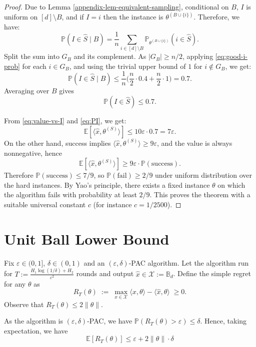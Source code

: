 \begin{proof}
Due to Lemma \ref{appendix-lem-equivalent-sampling}, conditional on $B$, $I$ is uniform on $[d]\setminus B$, and if $I=i$ then the instance is
$\theta^{(B\cup\{i\})}$. Therefore, we have:
\begin{equation}\label{eq:avg}
\mathbb P(I\in \hat S\mid B)
=\frac{1}{n}\sum_{i\in[d]\setminus B}\mathbb P_{\theta^{(B\cup\{i\})}}(i\in \hat S).
\end{equation}
Split the sum into $G_B$ and its complement. As $|G_B|\ge n/2$,
applying \eqref{eq:good-i-prob} for each $i\in G_B$, and using the trivial upper bound of $1$ for $i\notin G_B$, we get:
\[
\mathbb P(I\in \hat S\mid B)
\le \frac{1}{n}\Big(\frac{n}{2}\cdot 0.4 + \frac{n}{2}\cdot 1\Big)=0.7.
\]
Averaging over $B$ gives
\begin{equation}\label{eq:PI}
\mathbb P(I\in \hat S)\le 0.7.
\end{equation}

From \eqref{eq:value-vs-I} and \eqref{eq:PI}, we get:
\[
\mathbb E[\langle \hat x,\theta^{(S)}\rangle]\le 10\varepsilon\cdot 0.7=7\varepsilon.
\]
On the other hand, success implies $\langle \hat x,\theta^{(S)}\rangle\ge 9\varepsilon$, and the value is always
nonnegative, hence
\[
\mathbb E[\langle \hat x,\theta^{(S)}\rangle]\ge 9\varepsilon\cdot \mathbb P(\text{success}).
\]
Therefore $\mathbb P(\text{success})\le 7/9$, so $\mathbb P(\text{fail})\ge 2/9$ under uniform distribution over the hard instances.
By Yao's principle, there exists a fixed instance $\theta$ on which the algorithm fails with probability at least $2/9$.
This proves the theorem with a suitable universal constant $c$ (for instance $c=1/2500$).
\end{proof}
\section{Unit Ball Lower Bound}\label{appendix-ball-lower-bound}
Fix $\varepsilon\in (0,1]$, $\delta\in(0,1)$ and an $(\varepsilon,\delta)$-PAC algorithm. Let the algorithm run for $T:=\frac{H_1\log(1/\delta)+H_2}{\varepsilon^2}$ rounds and output $\hat x\in \mathcal{X}:=\mathbb{B}_d$.
Define the simple regret for any $\theta$ as
\[
R_T(\theta)\;:=\;\max_{x\in \mathcal{X}}\langle x,\theta\rangle-\langle \hat x,\theta\rangle \;\ge 0.
\]
Observe that $R_T(\theta)\leq 2\|\theta\|$.


As the algorithm is $(\varepsilon,\delta)$-PAC, we have $\mathbb P(R_T(\theta)>\varepsilon)\le \delta$. Hence, taking expectation, we have
\begin{equation}\label{eq:ball-simple-regret-upper}
    \mathbb{E}[R_T(\theta)]\leq \varepsilon+2\|\theta\|\cdot\delta 
\end{equation}



